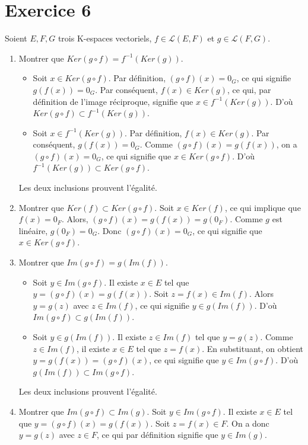 \documentclass[french]{yLectureNote}
\begin{document}
\section*{Exercice 6}

Soient $E, F, G$ trois K-espaces vectoriels, $f\in\mathcal{L}(E,F)$ et $g\in\mathcal{L}(F,G)$.

\begin{enumerate}
    \item Montrer que $Ker(g\circ f)=f^{-1}(Ker(g))$.
    \begin{itemize}
        \item Soit $x \in Ker(g\circ f)$. Par définition, $(g\circ f)(x) = 0_G$, ce qui signifie $g(f(x))=0_G$. Par conséquent, $f(x) \in Ker(g)$, ce qui, par définition de l'image réciproque, signifie que $x \in f^{-1}(Ker(g))$. D'où $Ker(g\circ f) \subset f^{-1}(Ker(g))$.
        \item Soit $x \in f^{-1}(Ker(g))$. Par définition, $f(x) \in Ker(g)$. Par conséquent, $g(f(x))=0_G$. Comme $(g\circ f)(x)=g(f(x))$, on a $(g\circ f)(x)=0_G$, ce qui signifie que $x \in Ker(g\circ f)$. D'où $f^{-1}(Ker(g)) \subset Ker(g\circ f)$.
    \end{itemize}
    Les deux inclusions prouvent l'égalité.

    \item Montrer que $Ker(f)\subset Ker(g\circ f)$.
    Soit $x \in Ker(f)$, ce qui implique que $f(x)=0_F$. Alors, $(g\circ f)(x) = g(f(x)) = g(0_F)$. Comme $g$ est linéaire, $g(0_F)=0_G$. Donc $(g\circ f)(x) = 0_G$, ce qui signifie que $x \in Ker(g\circ f)$.

    \item Montrer que $Im(g\circ f)=g(Im(f))$.
    \begin{itemize}
        \item Soit $y \in Im(g\circ f)$. Il existe $x \in E$ tel que $y=(g\circ f)(x)=g(f(x))$. Soit $z=f(x) \in Im(f)$. Alors $y=g(z)$ avec $z\in Im(f)$, ce qui signifie $y \in g(Im(f))$. D'où $Im(g\circ f) \subset g(Im(f))$.
        \item Soit $y \in g(Im(f))$. Il existe $z \in Im(f)$ tel que $y=g(z)$. Comme $z \in Im(f)$, il existe $x \in E$ tel que $z=f(x)$. En substituant, on obtient $y=g(f(x))=(g\circ f)(x)$, ce qui signifie que $y \in Im(g\circ f)$. D'où $g(Im(f)) \subset Im(g\circ f)$.
    \end{itemize}
    Les deux inclusions prouvent l'égalité.

    \item Montrer que $Im(g\circ f)\subset Im(g)$.
    Soit $y \in Im(g\circ f)$. Il existe $x \in E$ tel que $y=(g\circ f)(x)=g(f(x))$. Soit $z=f(x) \in F$. On a donc $y=g(z)$ avec $z \in F$, ce qui par définition signifie que $y \in Im(g)$.
\end{enumerate}
\end{document}
